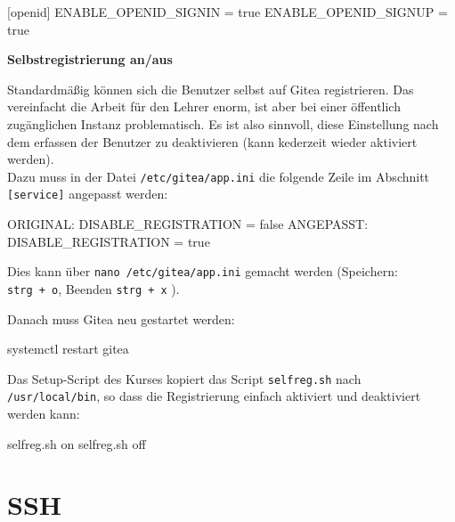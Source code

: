 \documentclass[
  letterpaper,
  DIV=11]{scrreprt}
\newenvironment{Shaded}{\begin{snugshade}}{\end{snugshade}}
\newcommand{\ExtensionTok}[1]{\textcolor[rgb]{0.00,0.23,0.31}{#1}}
\newcommand{\NormalTok}[1]{\textcolor[rgb]{0.00,0.23,0.31}{#1}}
\begin{document}
\begin{Shaded}
\begin{Highlighting}[]
\ExtensionTok{[openid]}
\ExtensionTok{ENABLE\_OPENID\_SIGNIN}\NormalTok{ = true}
\ExtensionTok{ENABLE\_OPENID\_SIGNUP}\NormalTok{ = true}
\end{Highlighting}
\end{Shaded}

\textbf{Selbstregistrierung an/aus}

Standardmäßig können sich die Benutzer selbst auf Gitea registrieren.
Das vereinfacht die Arbeit für den Lehrer enorm, ist aber bei einer
öffentlich zugänglichen Instanz problematisch. Es ist also sinnvoll,
diese Einstellung nach dem erfassen der Benutzer zu deaktivieren (kann
kederzeit wieder aktiviert werden).\\
Dazu muss in der Datei \texttt{/etc/gitea/app.ini} die folgende Zeile im
Abschnitt \texttt{{[}service{]}} angepasst werden:

\begin{Shaded}
\begin{Highlighting}[]
\ExtensionTok{ORIGINAL:}\NormalTok{  DISABLE\_REGISTRATION = false}
\ExtensionTok{ANGEPASST:}\NormalTok{ DISABLE\_REGISTRATION = true}
\end{Highlighting}
\end{Shaded}

Dies kann über \texttt{nano\ /etc/gitea/app.ini} gemacht werden
(Speichern: \texttt{strg\ +\ o}, Beenden \texttt{strg\ +\ x} ).

Danach muss Gitea neu gestartet werden:

\begin{Shaded}
\begin{Highlighting}[]
\ExtensionTok{systemctl}\NormalTok{ restart gitea}
\end{Highlighting}
\end{Shaded}

Das Setup-Script des Kurses kopiert das Script \texttt{selfreg.sh} nach
\texttt{/usr/local/bin}, so dass die Registrierung einfach aktiviert und
deaktiviert werden kann:

\begin{Shaded}
\begin{Highlighting}[]
\ExtensionTok{selfreg.sh}\NormalTok{ on}
\ExtensionTok{selfreg.sh}\NormalTok{ off}
\end{Highlighting}
\end{Shaded}

\section{SSH}\label{ssh}
\end{document}
